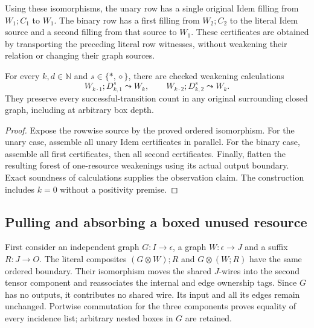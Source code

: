 Using these isomorphisms, the unary row has a single original Idem filling
from $W_1;C_1$ to $W_1$. The binary row has a first filling from $W_2;C_2$
to the literal Idem source and a second filling from that source to $W_1$.
These certificates are obtained by transporting the preceding literal row
witnesses, without weakening their relation or changing their graph sources.

\begin{theorem}
For every $k,d\in\mathbb N$ and $s\in\{*,\diamond\}$, there are checked
weakening calculations
\[
 W_{k\cdot1};D^s_{k,1}\leadsto W_k,
 \qquad W_{k\cdot2};D^s_{k,2}\leadsto W_k.
\]
They preserve every successful-transition count in any original surrounding
closed graph, including at arbitrary box depth.
\end{theorem}
\begin{proof}
Expose the rowwise source by the proved ordered isomorphism. For the unary
case, assemble all unary Idem certificates in parallel. For the binary case,
assemble all first certificates, then all second certificates. Finally,
flatten the resulting forest of one-resource weakenings using its actual
output boundary. Exact soundness of calculations supplies the observation
claim. The construction includes $k=0$ without a positivity premise.
\end{proof}

\subsection{Pulling and absorbing a boxed unused resource}
First consider an independent graph $G:I\to\epsilon$, a graph
$W:\epsilon\to J$ and a suffix $R:J\to O$. The literal composites
$(G\otimes W);R$ and $G\otimes(W;R)$ have the same ordered boundary.
Their isomorphism moves the shared $J$-wires into the second tensor
component and reassociates the internal and edge ownership tags. Since $G$
has no outputs, it contributes no shared wire. Its input and all its edges
remain unchanged. Portwise commutation for the three components proves
equality of every incidence list; arbitrary nested boxes in $G$ are retained.


